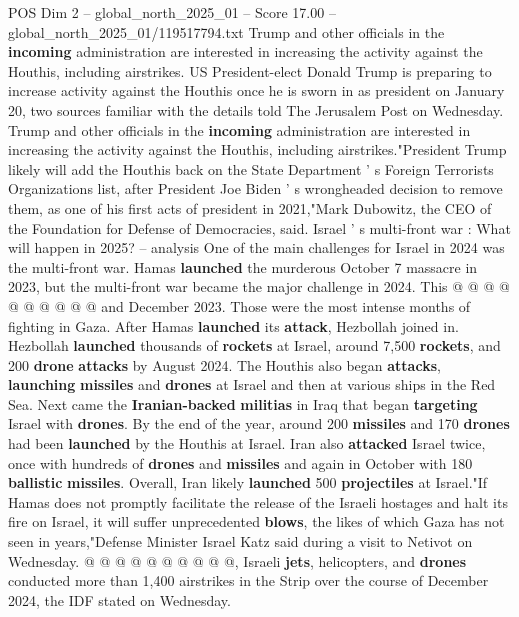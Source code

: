 \begin{textsample}{POS Dim 2 – global\_north\_2025\_01 – Score 17.00 – global\_north\_2025\_01/119517794.txt}  \label{ex:f2_pos_398}
Trump and other officials in the \textbf{incoming} administration are interested in increasing the activity against the Houthis, including airstrikes.
US President-elect Donald Trump is preparing to increase activity against the Houthis once he is sworn in as president on January 20, two sources familiar with the details told The Jerusalem Post on Wednesday.
Trump and other officials in the \textbf{incoming} administration are interested in increasing the activity against the Houthis, including airstrikes."President Trump likely will add the Houthis back on the State Department ' s Foreign Terrorists Organizations list, after President Joe Biden ' s wrongheaded decision to remove them, as one of his first acts of president in 2021,"Mark Dubowitz, the CEO of the Foundation for Defense of Democracies, said.
Israel ' s multi-front war : What will happen in 2025? -- analysis One of the main challenges for Israel in 2024 was the multi-front war.
Hamas \textbf{launched} the murderous October 7 massacre in 2023, but the multi-front war became the major challenge in 2024.
This @ @ @ @ @ @ @ @ @ @ and December 2023.
Those were the most intense months of fighting in Gaza.
After Hamas \textbf{launched} its \textbf{attack}, Hezbollah joined in.
Hezbollah \textbf{launched} thousands of \textbf{rockets} at Israel, around 7,500 \textbf{rockets}, and 200 \textbf{drone} \textbf{attacks} by August 2024.
The Houthis also began \textbf{attacks}, \textbf{launching} \textbf{missiles} and \textbf{drones} at Israel and then at various ships in the Red Sea.
Next came the \textbf{Iranian-backed} \textbf{militias} in Iraq that began \textbf{targeting} Israel with \textbf{drones}.
By the end of the year, around 200 \textbf{missiles} and 170 \textbf{drones} had been \textbf{launched} by the Houthis at Israel.
Iran also \textbf{attacked} Israel twice, once with hundreds of \textbf{drones} and \textbf{missiles} and again in October with 180 \textbf{ballistic} \textbf{missiles}.
Overall, Iran likely \textbf{launched} 500 \textbf{projectiles} at Israel."If Hamas does not promptly facilitate the release of the Israeli hostages and halt its fire on Israel, it will suffer unprecedented \textbf{blows}, the likes of which Gaza has not seen in years,"Defense Minister Israel Katz said during a visit to Netivot on Wednesday. @ @ @ @ @ @ @ @ @ @, Israeli \textbf{jets}, helicopters, and \textbf{drones} conducted more than 1,400 airstrikes in the Strip over the course of December 2024, the IDF stated on Wednesday.

\end{textsample}
